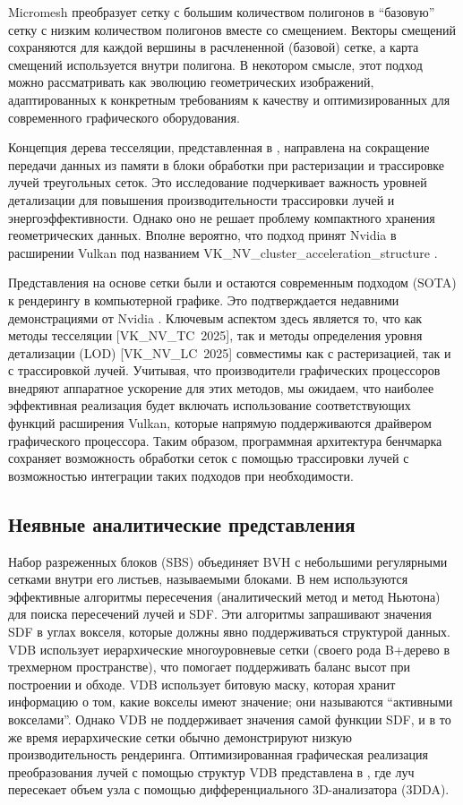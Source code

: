 \documentclass[a4paper,hidelinks,12pt]{article}
\begin{document}
Micromesh\cite{micromesh} преобразует сетку с большим количеством полигонов в “базовую” сетку с низким количеством полигонов вместе со смещением. Векторы смещений сохраняются для каждой вершины в расчлененной (базовой) сетке, а карта смещений используется внутри полигона. В некотором смысле, этот подход можно рассматривать как эволюцию геометрических изображений, адаптированных к конкретным требованиям к качеству и оптимизированных для современного графического оборудования. 

Концепция дерева тесселяции, представленная в \cite{LA_lods}, направлена на сокращение передачи данных из памяти в блоки обработки при растеризации и трассировке лучей треугольных сеток. Это исследование подчеркивает важность уровней детализации для повышения производительности трассировки лучей и энергоэффективности. Однако оно не решает проблему компактного хранения геометрических данных. Вполне вероятно, что подход \cite{LA_lods} принят Nvidia в расширении Vulkan под названием \newline VK\_NV\_cluster\_acceleration\_structure \cite{vknvtc}.

Представления на основе сетки были и остаются современным подходом (SOTA) к рендерингу в компьютерной графике. 
Это подтверждается недавними демонстрациями от Nvidia \cite{vknvtc}. 
Ключевым аспектом здесь является то, что как методы тесселяции [VK\_NV\_TC\ 2025], так и методы определения уровня детализации
 (LOD) [VK\_NV\_LC\ 2025] совместимы как с растеризацией, так и с трассировкой лучей. Учитывая, что производители 
 графических процессоров внедряют аппаратное ускорение для этих методов, мы ожидаем, что наиболее эффективная реализация 
 будет включать использование соответствующих функций расширения Vulkan, которые напрямую поддерживаются драйвером графического 
 процессора. Таким образом, программная архитектура бенчмарка сохраняет возможность обработки сеток с помощью трассировки лучей с возможностью интеграции таких подходов при необходимости. 

\subsection{Неявные аналитические представления}

Набор разреженных блоков (SBS) \cite{octree} объединяет BVH с небольшими регулярными сетками 
внутри его листьев, называемыми блоками. В нем используются эффективные алгоритмы пересечения 
(аналитический метод и метод Ньютона) для поиска пересечений лучей и SDF. Эти алгоритмы запрашивают значения SDF 
в углах вокселя, которые должны явно поддерживаться структурой данных. VDB \cite{vdb} использует иерархические 
многоуровневые сетки (своего рода B+дерево в трехмерном пространстве), что помогает поддерживать баланс высот при построении и 
обходе. VDB использует битовую маску, которая хранит информацию о том, какие вокселы имеют значение; они называются “активными вокселами”. 
Однако VDB не поддерживает значения самой функции SDF, и в то же время иерархические сетки обычно демонстрируют низкую 
производительность рендеринга. Оптимизированная графическая реализация преобразования лучей с помощью структур 
VDB представлена в \cite{gvdb}, где луч пересекает объем узла с помощью дифференциального 3D-анализатора (3DDA).
\end{document}
